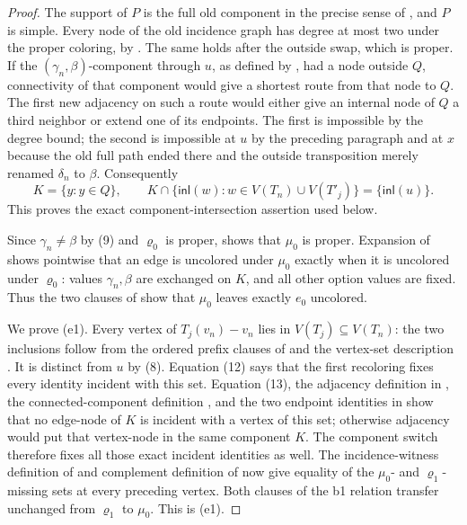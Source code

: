 \begin{proof}
The support of \(P\) is the full old component in the precise sense of
, and \(P\) is simple.  Every node of the old
incidence graph has degree at most two under the proper coloring, by
.  The same holds after the
outside swap, which is proper.  If the
\((\gamma_n,\beta)\)-component through \(u\), as defined by
, had a node outside \(Q\), connectivity of
that component would give a shortest route from that node to \(Q\).  The
first new adjacency on such a route would either give an internal
node of \(Q\) a third neighbor or extend one of its endpoints.  The first
is impossible by the degree bound; the second is impossible at \(u\)
by the preceding paragraph and at \(x\) because the old full path ended
there and the outside transposition merely renamed
\(\delta_n\) to \(\beta\).  Consequently
\[
 K=\{y:y\in Q\},\qquad
 K\cap\{\mathsf{inl}(w):w\in V(T_n)\cup V(T'_j)\}
   =\{\mathsf{inl}(u)\}.                                     \tag{13}
\]
This proves the exact component-intersection assertion used below.

Since \(\gamma_n\ne\beta\) by (9) and
\(\varrho_0\) is proper,
 shows that \(\mu_0\) is proper.
Expansion of  shows pointwise that an
edge is uncolored under \(\mu_0\) exactly when it is uncolored under
\(\varrho_0\): values \(\gamma_n,\beta\) are exchanged on \(K\), and all
other option values are fixed.  Thus the two clauses of
 show that \(\mu_0\) leaves exactly \(e_0\)
uncolored.

We prove (e1).  Every vertex of \(T_j(v_n)-v_n\) lies in
\(V(T_j)\subseteq V(T_n)\): the two inclusions follow from the ordered
prefix clauses of  and the vertex-set
description .  It is distinct from \(u\)
by (8).  Equation
(12) says that the first recoloring fixes every identity incident with
this set.  Equation (13), the adjacency definition in
, the connected-component definition
, and the two endpoint identities in
 show that no edge-node of \(K\) is incident
with a vertex of this set; otherwise adjacency would put that vertex-node
in the same component \(K\).  The component switch therefore fixes all
those exact incident identities as well.  The incidence-witness definition of
 and complement definition of
 now give equality of the \(\mu_0\)- and
\(\varrho_1\)-missing sets at every preceding vertex.  Both clauses of
the b1  relation transfer unchanged
from \(\varrho_1\) to \(\mu_0\).  This is (e1).


\end{proof}
